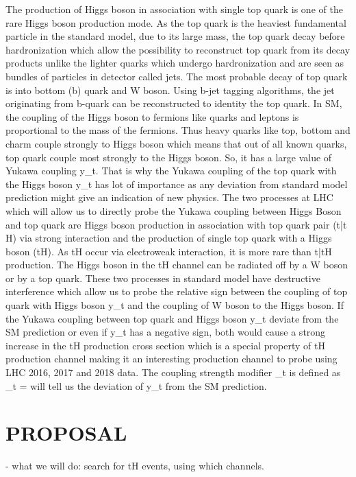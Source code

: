 \documentclass[final,3p]{CSP}
\begin{document}
The production of Higgs boson in association with single top quark is one of the rare Higgs boson production mode. As the top 
quark is the heaviest fundamental particle in the standard model, due to its large mass, the top quark decay before 
hardronization which allow the possibility to reconstruct top quark from its decay products unlike the lighter quarks which 
undergo hardronization and are seen as bundles of particles in detector called jets. The most probable decay of top quark is into 
bottom (b) quark and W boson. Using b-jet tagging algorithms, the jet originating from b-quark can be reconstructed to identity 
the top quark. In SM, the coupling of the Higgs boson to fermions like quarks and leptons is proportional to the mass of the 
fermions. Thus heavy quarks like top, bottom and charm couple strongly to Higgs boson which means that out of all known quarks, 
top quark couple most strongly to the Higgs boson. So, it has a large value of Yukawa coupling y_t. That is why the Yukawa 
coupling of the top quark with the Higgs boson y_t has lot of importance as any deviation from standard model prediction might 
give an indication of new physics. The two processes at LHC which will allow us to directly probe the Yukawa coupling between 
Higgs Boson and top quark are Higgs boson production in association with top quark pair (t\bar{t} H) via strong interaction and 
the production of single top quark with a Higgs boson (tH). As tH occur via electroweak interaction, it is more rare than 
t\bar{t}H production. The Higgs boson in the tH channel can be radiated off by a W boson or by a top quark. These two processes 
in standard model have destructive interference which allow us to probe the relative sign between the coupling of top quark with 
Higgs boson y_t and the coupling of W boson to the Higgs boson. If the Yukawa coupling between top quark and Higgs boson y_t 
deviate from the SM prediction or even if y_t has a negative sign, both would cause a strong increase in the tH production cross 
section which is a special property of tH production channel making it an interesting production channel to probe using LHC 
2016, 2017 and 2018 data. The coupling strength modifier \kappa_t is defined as \kappa_t =  will tell us the 
deviation of y_t from the SM prediction.



\section{PROPOSAL}
- what we will do:  search for tH events, using which channels.
\end{document}
